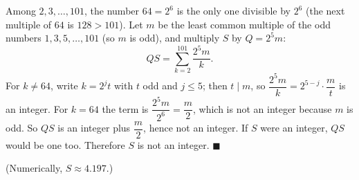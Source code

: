 Among $2,3,\dots,101$, the number $64=2^6$ is the only one divisible by $2^6$ (the next multiple of $64$ is $128>101$). Let $m$ be the least common multiple of the odd numbers $1,3,5,\dots,101$ (so $m$ is odd), and multiply $S$ by $Q=2^5m$:
\[
QS=\sum_{k=2}^{101}\dfrac{2^5m}{k}.
\]
For $k\ne64$, write $k=2^jt$ with $t$ odd and $j\le5$; then $t\mid m$, so $\dfrac{2^5m}{k}=2^{5-j}\cdot\dfrac {m}{t}$ is an integer. For $k=64$ the term is $\dfrac{2^5m}{2^6}=\dfrac {m}{2}$, which is not an integer because $m$ is odd. So $QS$ is an integer plus $\dfrac {m}{2}$, hence not an integer. If $S$ were an integer, $QS$ would be one too. Therefore $S$ is not an integer. $\blacksquare$

(Numerically, $S\approx4.197$.)
